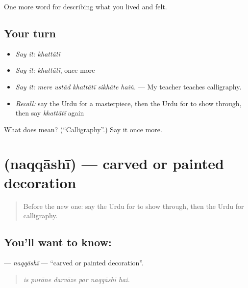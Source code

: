\begin{grammarlens}[title={What you've built}]
One more word for describing what you lived and felt.
\end{grammarlens}

\subsection*{Your turn}
\begin{itemize}
\raggedright
  \item \emph{Say it:} \emph{khattātī}
  \item \emph{Say it:} \emph{khattātī}, once more
  \item \emph{Say it:} \emph{mere ustād khattātī sikhāte haiṅ.} — My teacher teaches calligraphy.
  \item \emph{Recall:} say the Urdu for a masterpiece, then the Urdu for to show through, then say \emph{khattātī} again
\end{itemize}

\begin{tcolorbox}[breakable,colback=teal!4,colframe=teal!35!black,title={Before you move on}]
What does  mean? (\textquotedblleft{}Calligraphy\textquotedblright{}.) Say it once more.
\end{tcolorbox}
\section[\texorpdfstring{\ur{نقاشی} (naqqāshī)}{نقاشی (naqqāshī)}]{ (naqqāshī) — carved or painted decoration}

\label{lesson:UR-C516-naqqashi}



\begin{quote}
Before the new one: say the Urdu for to show through, then the Urdu for calligraphy.
\end{quote}

\subsection*{You'll want to know: }
\textbf{} — \emph{naqqāshī} — \textquotedblleft{}carved or painted decoration\textquotedblright{}.

\begin{quote}
     
\end{quote}

\begin{quote}
\emph{is purāne darvāze par naqqāshī hai.}
\end{quote}

